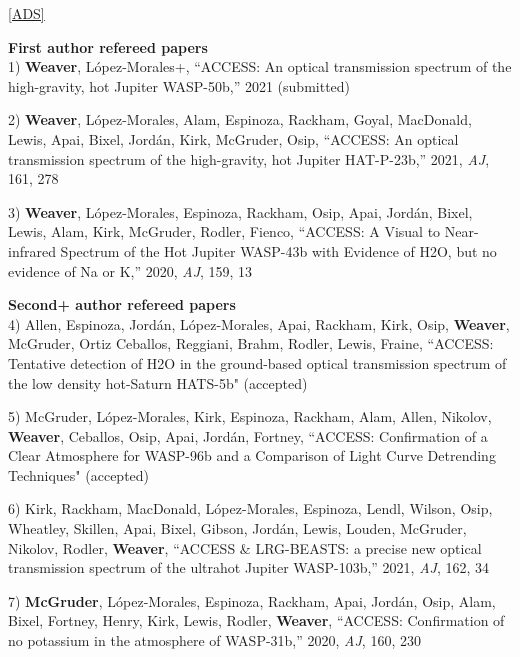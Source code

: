 

\begin{cventries}
\raggedright{
\href{https://ui.adsabs.harvard.edu/public-libraries/6nMcPukqSpiQq_0Ak7g8sA}{[ADS]}

\textbf{First author refereed papers}\\
1) \textbf{Weaver}, L\'opez-Morales+,
``ACCESS: An optical transmission spectrum of the high-gravity, hot Jupiter WASP-50b,'' 2021 (submitted)

2) \textbf{Weaver}, L\'opez-Morales, Alam, Espinoza, Rackham,
Goyal, MacDonald, Lewis,
Apai, Bixel, Jord\'an, Kirk, 
McGruder, Osip,
``ACCESS: An optical transmission spectrum of the high-gravity, hot Jupiter HAT-P-23b,'' 2021, \textit{AJ}, 161, 278

3) \textbf{Weaver}, L\'opez-Morales, Espinoza, Rackham,
Osip, Apai, Jord\'an, Bixel, Lewis, Alam, Kirk, 
McGruder, Rodler, Fienco, 
``ACCESS: A Visual to Near-infrared Spectrum of the Hot Jupiter WASP-43b with Evidence of H2O, but no evidence of Na or K,'' 2020, 
\textit{AJ}, 159, 13 

\textbf{Second+ author refereed papers}\\
4) Allen, Espinoza, Jord\'an, L\'opez-Morales, Apai, Rackham, Kirk, Osip, \textbf{Weaver}, McGruder, Ortiz Ceballos, Reggiani, Brahm, Rodler, Lewis, Fraine, ``ACCESS: Tentative detection of H2O in the ground-based optical transmission spectrum of the low
density hot-Saturn HATS-5b" (accepted)

5) McGruder, L\'opez-Morales, Kirk, Espinoza, Rackham, Alam, Allen, Nikolov, \textbf{Weaver}, Ceballos, Osip, Apai, Jord\'an, Fortney, ``ACCESS: Confirmation of a Clear Atmosphere for WASP-96b and a Comparison of Light Curve Detrending Techniques" (accepted)

6) Kirk, Rackham, MacDonald, L\'opez-Morales, Espinoza, Lendl, Wilson, Osip, Wheatley, Skillen, Apai, Bixel, Gibson, Jord\'an,
Lewis, Louden, McGruder, Nikolov, Rodler, \textbf{Weaver},
``ACCESS \& LRG-BEASTS: a precise new optical transmission spectrum of the ultrahot Jupiter WASP-103b,'' 2021, \textit{AJ}, 162, 34

7) \textbf{McGruder}, L\'opez-Morales, Espinoza, Rackham,
Apai, Jord\'an, Osip, Alam, Bixel, Fortney, Henry, Kirk, Lewis, Rodler, \textbf{Weaver},
``ACCESS: Confirmation of no potassium in the atmosphere of WASP-31b,'' 2020, 
\textit{AJ}, 160, 230 

}
\end{cventries}
